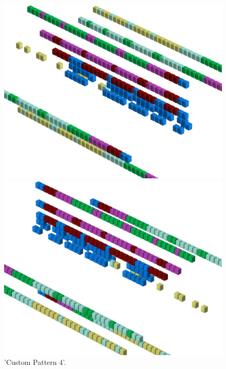 \begin{figure}[H]
    \centering
    \begin{adjustbox}{width=12cm,center}
      \includegraphics[width=12cm]{src/patterns/pattern12-45.png}%
    \end{adjustbox}
    \begin{adjustbox}{width=12cm,margin=0cm -4cm}
      \includegraphics[width=12cm]{src/patterns/pattern12-225.png}%
    \end{adjustbox}
\caption{'Custom Pattern 4'.}
\end{figure}
\clearpage


